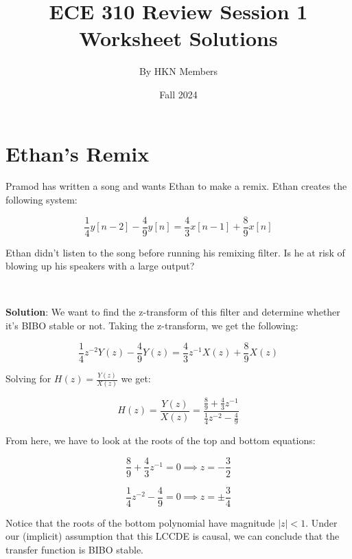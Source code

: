\documentclass{article}
\title{ECE 310 Review Session 1 Worksheet Solutions}
\author{By HKN Members}
\date{Fall 2024}
\begin{document}
\maketitle

\section{Ethan's Remix}
Pramod has written a song and wants Ethan to make a remix. Ethan creates the following system:

$$\frac{1}{4} y[n-2] - \frac{4}{9} y[n] = \frac{4}{3} x[n-1] + \frac{8}{9} x[n]$$

\noindent Ethan didn't listen to the song before running his remixing filter. Is he at risk of blowing up his speakers with a large output?

\

\noindent \textbf{Solution}: We want to find the z-transform of this filter and determine whether it's BIBO stable or not. Taking the z-transform, we get the following:

$$\frac{1}{4}z^{-2}Y(z) - \frac{4}{9}Y(z) = \frac{4}{3}z^{-1}X(z) + \frac{8}{9}X(z)$$

\noindent Solving for $H(z) = \frac{Y(z)}{X(z)}$ we get:

$$H(z) = \frac{Y(z)}{X(z)} = \frac{\frac{8}{9} + \frac{4}{3}z^{-1}}{\frac{1}{4}z^{-2} - \frac{4}{9}}$$

\noindent From here, we have to look at the roots of the top and bottom equations:

$$\frac{8}{9} + \frac{4}{3}z^{-1} = 0 \implies z = -\frac{3}{2}$$

$$\frac{1}{4}z^{-2} - \frac{4}{9} = 0 \implies z = \pm \frac{3}{4}$$

\noindent Notice that the roots of the bottom polynomial have magnitude $|z| < 1$. Under our (implicit) assumption that this LCCDE is causal, we can conclude that the transfer function is BIBO stable.

\newpage
\end{document}
